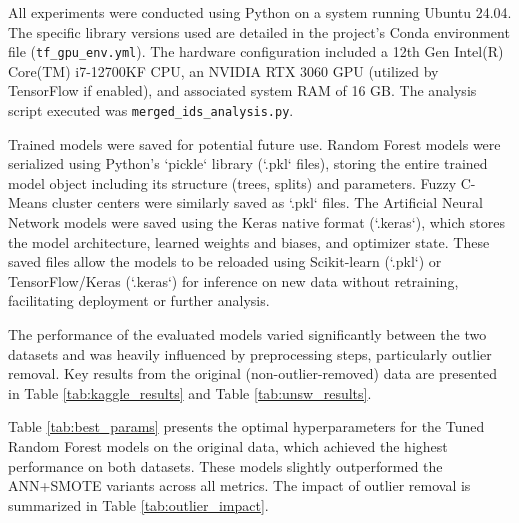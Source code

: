 \documentclass[sigconf,screen,final,nonacm]{acmart}
\begin{document}
All experiments were conducted using Python on a system running Ubuntu 24.04. The specific library versions used are detailed in the project's Conda environment file (\texttt{tf\_gpu\_env.yml}). The hardware configuration included a 12th Gen Intel(R) Core(TM) i7-12700KF CPU, an NVIDIA RTX 3060 GPU (utilized by TensorFlow if enabled), and associated system RAM of 16 GB. The analysis script executed was \texttt{merged\_ids\_analysis.py}.

Trained models were saved for potential future use. Random Forest models were serialized using Python's `pickle` library (`.pkl` files), storing the entire trained model object including its structure (trees, splits) and parameters. Fuzzy C-Means cluster centers were similarly saved as `.pkl` files. The Artificial Neural Network models were saved using the Keras native format (`.keras`), which stores the model architecture, learned weights and biases, and optimizer state. These saved files allow the models to be reloaded using Scikit-learn (`.pkl`) or TensorFlow/Keras (`.keras`) for inference on new data without retraining, facilitating deployment or further analysis.

The performance of the evaluated models varied significantly between the two datasets and was heavily influenced by preprocessing steps, particularly outlier removal. Key results from the original (non-outlier-removed) data are presented in Table \ref{tab:kaggle_results} and Table \ref{tab:unsw_results}.

Table \ref{tab:best_params} presents the optimal hyperparameters for the Tuned Random Forest models on the original data, which achieved the highest performance on both datasets. These models slightly outperformed the ANN+SMOTE variants across all metrics. The impact of outlier removal is summarized in Table \ref{tab:outlier_impact}.
\end{document}

